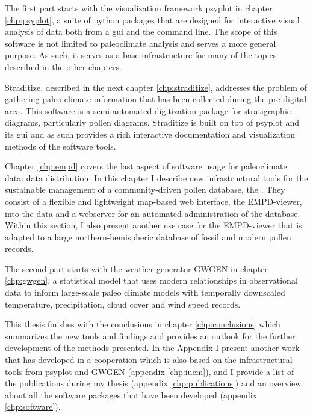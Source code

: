 \begin{refsection}
The first part starts with the visualization framework psyplot in chapter \ref{chp:psyplot}, a suite of python packages that are designed for interactive visual analysis of data both from a \gls{gui} and the command line. The scope of this software is not limited to paleoclimate analysis and serves a more general purpose. As such, it serves as a base infrastructure for many of the topics described in the other chapters.

Straditize, described in the next chapter \ref{chp:straditize}, addresses the problem of gathering paleo-climate information that has been collected during the pre-digital area. This software is a semi-automated digitization package for stratigraphic diagrams, particularly pollen diagrams. Straditize is built on top of psyplot and its \gls{gui} and as such provides a rich interactive documentation and visualization methods of the software tools.

Chapter \ref{chp:empd} covers the last aspect of software usage for paleoclimate data: data distribution. In this chapter I describe new infrastructural tools for the sustainable management of a community-driven pollen database, the . They consist of a flexible and lightweight map-based web interface, the EMPD-viewer, into the data and a webserver for an automated administration of the database. Within this section, I also present another use case for the EMPD-viewer that is adapted to a large northern-hemispheric database of fossil and modern pollen records.

The second part starts with the weather generator GWGEN in chapter \ref{chp:gwgen}, a statistical model that uses modern relationships in observational data to inform large-scale paleo climate models with temporally downscaled temperature, precipitation, cloud cover and wind speed records.


This thesis finishes with the conclusions in chapter \ref{chp:conclusions} which summarizes the new tools and findings and provides an outlook for the further development of the methods presented. In the \hyperlink{appendix}{Appendix} I present another work that has developed in a cooperation which is also based on the infrastructural tools from psyplot and GWGEN (appendix \ref{chp:iucm}), and I provide a list of the publications during my thesis (appendix \ref{chp:publications}) and an overview about all the software packages that have been developed (appendix \ref{chp:software}).

\printbibliography[heading=subbibintoc]

\end{refsection}
